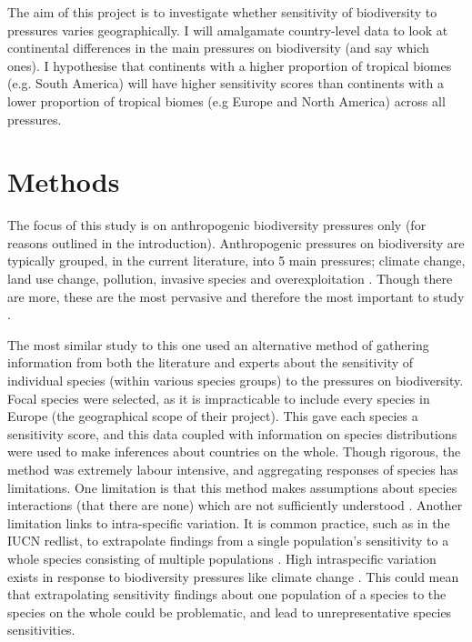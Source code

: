 \documentclass[11pt, a4paper, titlepage]{article}
\begin{document}
 	The aim of this project is to investigate whether sensitivity of biodiversity to pressures varies geographically. I will amalgamate country-level data to look at continental differences in the main pressures on biodiversity (and say which ones). I hypothesise that continents with a higher proportion of tropical biomes (e.g. South America) will have higher sensitivity scores than continents with a lower proportion of tropical biomes (e.g Europe and North America) across all pressures.  \newpage
 	
    \section*{Methods}

	The focus of this study is on anthropogenic biodiversity pressures only (for reasons outlined in the introduction). Anthropogenic pressures on biodiversity are typically grouped, in the current literature, into 5 main pressures; climate change, land use change, pollution, invasive species and overexploitation \citep{watson2019summary}. Though there are more, these are the most pervasive and therefore the most important to study \citep{mazor2018global}. 
	
	The most similar study to this one \citep{louette2010bioscore} used an alternative method of gathering information from both the literature and experts about the sensitivity of individual species (within various species groups) to the pressures on biodiversity. Focal species were selected, as it is impracticable to include every species in Europe (the geographical scope of their project). This gave each species a sensitivity score, and this data coupled with information on species distributions were used to make inferences about countries on the whole. 
	Though rigorous, the \cite{louette2010bioscore} method was extremely labour intensive, and aggregating responses of species has limitations. One limitation is that this method makes assumptions about species interactions (that there are none) which are not sufficiently understood \citep{hansen2001global}. Another limitation links to intra-specific variation. It is common practice, such as in the IUCN redlist, to extrapolate findings from a single population's sensitivity to a whole species consisting of multiple populations \citep{iucn2001iucn} \citep{buckley2012functional}. High intraspecific variation exists in response to biodiversity pressures like climate change \citep{mclean2018high} \citep{both2004large} \citep{mayor2016assessing}. This could mean that extrapolating sensitivity findings about one population of a species to the species on the whole could be problematic, and lead to unrepresentative species sensitivities.
	
\end{document}

